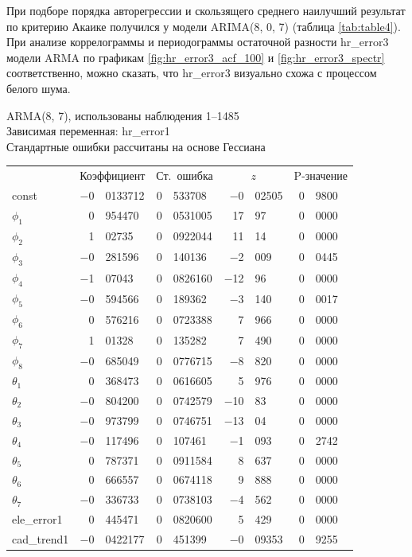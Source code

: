 \documentclass[a4paper,12pt]{article}
\begin{document}
При подборе порядка авторегрессии и скользящего среднего наилучший результат по критерию Акаике получился у модели ARIMA(8, 0, 7) (таблица \ref{tab:table4}). При анализе коррелограммы и периодограммы остаточной разности hr\_error3 модели ARMA по графикам \ref{fig:hr_error3_acf_100} и \ref{fig:hr_error3_spectr} соответственно, можно сказать, что hr\_error3 визуально схожа с процессом белого шума.

\begin{table}[H]
\begin{center}
	
	ARMA(8, 7), использованы наблюдения 1--1485\\
	Зависимая переменная: hr\_error1\\
	Стандартные ошибки рассчитаны на основе Гессиана
	
	\vspace{1em}
	
	\begin{tabular}{lr@{,}lr@{,}lr@{,}lr@{,}l}
		&
		\multicolumn{2}{c}{Коэффициент} &
		\multicolumn{2}{c}{Ст.\ ошибка} &
		\multicolumn{2}{c}{$z$} &
		\multicolumn{2}{c}{P-значение} \\[1ex]
		const &
		$-$0&0133712 &
		0&533708 &
		$-$0&02505 &
		0&9800 \\
		$\phi_{1}$ &
		0&954470 &
		0&0531005 &
		17&97 &
		0&0000 \\
		$\phi_{2}$ &
		1&02735 &
		0&0922044 &
		11&14 &
		0&0000 \\
		$\phi_{3}$ &
		$-$0&281596 &
		0&140136 &
		$-$2&009 &
		0&0445 \\
		$\phi_{4}$ &
		$-$1&07043 &
		0&0826160 &
		$-$12&96 &
		0&0000 \\
		$\phi_{5}$ &
		$-$0&594566 &
		0&189362 &
		$-$3&140 &
		0&0017 \\
		$\phi_{6}$ &
		0&576216 &
		0&0723388 &
		7&966 &
		0&0000 \\
		$\phi_{7}$ &
		1&01328 &
		0&135282 &
		7&490 &
		0&0000 \\
		$\phi_{8}$ &
		$-$0&685049 &
		0&0776715 &
		$-$8&820 &
		0&0000 \\
		$\theta_{1}$ &
		0&368473 &
		0&0616605 &
		5&976 &
		0&0000 \\
		$\theta_{2}$ &
		$-$0&804200 &
		0&0742579 &
		$-$10&83 &
		0&0000 \\
		$\theta_{3}$ &
		$-$0&973799 &
		0&0746751 &
		$-$13&04 &
		0&0000 \\
		$\theta_{4}$ &
		$-$0&117496 &
		0&107461 &
		$-$1&093 &
		0&2742 \\
		$\theta_{5}$ &
		0&787371 &
		0&0911584 &
		8&637 &
		0&0000 \\
		$\theta_{6}$ &
		0&666557 &
		0&0674118 &
		9&888 &
		0&0000 \\
		$\theta_{7}$ &
		$-$0&336733 &
		0&0738103 &
		$-$4&562 &
		0&0000 \\
		ele\_error1 &
		0&445471 &
		0&0820600 &
		5&429 &
		0&0000 \\
		cad\_trend1 &
		$-$0&0422177 &
		0&451399 &
		$-$0&09353 &
		0&9255 \\
	\end{tabular}
	

\end{center}
\end{table}
\end{document}
